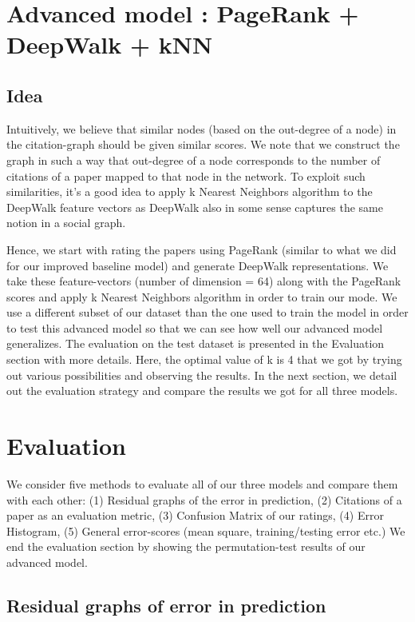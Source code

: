 \documentclass[a4paper, 11pt]{article}
\begin{document}
\section{Advanced model : PageRank + DeepWalk + kNN}
\subsection{Idea}
Intuitively, we believe that similar nodes (based on the out-degree of a node) in the citation-graph should be given similar scores. We note that we construct the graph in such a way that out-degree of a node corresponds to the number of citations of a paper mapped to that node in the network. To exploit such similarities, it's a good idea to apply k Nearest Neighbors algorithm to the DeepWalk feature vectors as DeepWalk also in some sense captures the same notion in a social graph.

\vspace{0.5cm}

Hence, we start with rating the papers using PageRank (similar to what we did for our improved baseline model) and generate DeepWalk representations. We take these feature-vectors (number of dimension = 64) along with the PageRank scores and apply k Nearest Neighbors algorithm in order to train our mode. We use a different subset of our dataset than the one used to train the model in order to test this advanced model so that we can see how well our advanced model generalizes. The evaluation on the test dataset is presented in the Evaluation section with more details. Here, the optimal value of k is 4 that we got by trying out various possibilities and observing the results. In the next section, we detail out the evaluation strategy and compare the results we got for all three models.

\section{Evaluation}

We consider five methods to evaluate all of our three models and compare them with each other: (1) Residual graphs of the error in prediction, (2) Citations of a paper as an evaluation metric, (3) Confusion Matrix of our ratings, (4) Error Histogram, (5)  General error-scores (mean square, training/testing error etc.) We end the evaluation section by showing the permutation-test results of our advanced model.

\subsection{Residual graphs of error in prediction}
\end{document}
